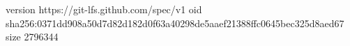 version https://git-lfs.github.com/spec/v1
oid sha256:0371dd908a50d7d82d182d0f63a40298de5aaef21388ffc0645bec325d8aed67
size 2796344

